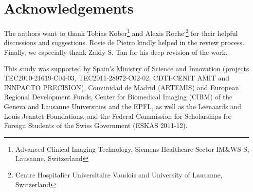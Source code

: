 \section*{Acknowledgements}
\label{sec:acks}
The authors want to thank Tobias Kober\footnote{Advanced Clinical Imaging 
Technology, Siemens Healthcare Sector IM\&WS S, Lausanne, Switzerland} and 
Alexis Roche\footnotemark[\value{footnote}]\textsuperscript{,}\footnote{Centre 
Hospitalier Universitaire Vaudois and University of Lausanne, Switzerland} for 
their helpful discussions and suggestions. Rosie de Pietro kindly helped in the review
process. Finally, we especially thank Zaldy S. Tan for his deep revision
of the work.
 
 This study was supported by Spain's Ministry of Science and Innovation
  (projects TEC2010-21619-C04-03, TEC2011-28972-C02-02, CDTI-CENIT AMIT and
  INNPACTO PRECISION),
  Comunidad de Madrid (ARTEMIS) and
  European Regional Development Funds,
  Center for Biomedical Imaging (CIBM) of the Geneva and Lausanne Universities
  and the EPFL,
  as well as the Leenaards and Louis Jeantet Foundations,
  and the Federal Commission for Scholarships for Foreign Students of the
  Swiss Government (ESKAS 2011-12).
